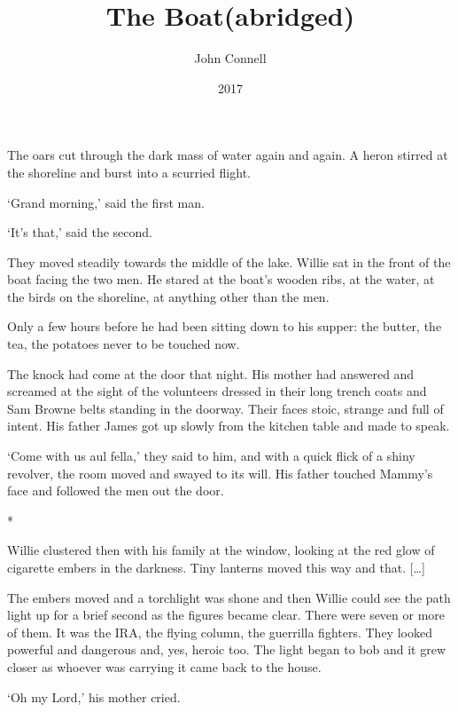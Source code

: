 \documentclass[10pt,a4paper]{article}
\newcommand{\subtitle}[1]{\vspace{10pt}\newline\normalsize\plantin #1}
\begin{document}
\title{The Boat\subtitle{(abridged)}}
\date{2017}
\author{John Connell}
\maketitle
    
\thispagestyle{plain}
\setcounter{page}{1}
\noindent\linenumbers The oars cut through the dark mass of water again and again. A heron stirred at the shoreline and burst into a scurried flight.

‘Grand morning,’ said the first man.

‘It’s that,’ said the second.

They moved steadily towards the middle of the lake. Willie sat in the front of the boat facing the two men. He stared at the boat’s wooden ribs, at the water, at the birds on the shoreline, at anything other than the men.

Only a few hours before he had been sitting down to his supper: the butter, the tea, the potatoes never to be touched now.

The knock had come at the door that night. His mother had answered and screamed at the sight of the volunteers dressed in their long trench coats and Sam Browne belts standing in the doorway. Their faces stoic, strange and full of intent. His father James got up slowly from the kitchen table and made to speak.

‘Come with us aul fella,’ they said to him, and with a quick flick of a shiny revolver, the room moved and swayed to its will. His father touched Mammy’s face and followed the men out the door.
 
\begin{center}*\end{center}

Willie clustered then with his family at the window, looking at the red glow of cigarette embers in the darkness. Tiny lanterns moved this way and that. […]

The embers moved and a torchlight was shone and then Willie could see the path light up for a brief second as the figures became clear. There were seven or more of them. It was the IRA, the flying column, the guerrilla fighters. They looked powerful and dangerous and, yes, heroic too. The light began to bob and it grew closer as whoever was carrying it came back to the house.

‘Oh my Lord,’ his mother cried.
\end{document}
